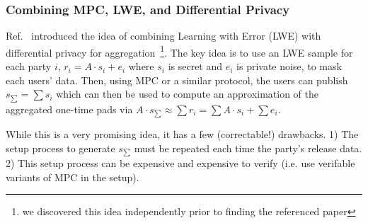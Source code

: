 \subsubsection*{Combining MPC, LWE, and Differential Privacy}
Ref.~\cite{stevens2021efficientdifferentiallyprivatesecure} introduced the idea of combining Learning with Error (LWE) with differential privacy for aggregation~\footnote{we discovered this idea independently prior to finding the referenced paper}.
The key idea is to use an LWE sample for each party $i$, $r_i = A \cdot s_i + e_i$ where $s_i$ is secret and $e_i$ is private noise, to mask each users' data.
Then, using MPC or a similar protocol, the users can publish $s_{\sum} = \sum s_i$ which can then be used to compute an approximation of the aggregated one-time pads via $A \cdot s_{\sum} \approx \sum r_i = \sum A \cdot s_i + \sum e_i$.

While this is a very promising idea, it has a few (correctable!) drawbacks.
1) The setup process to generate $s_{\sum}$ must be repeated each time the party's release data.
2) This setup process can be expensive and expensive to verify (i.e. use verifable variants of MPC in the setup).


